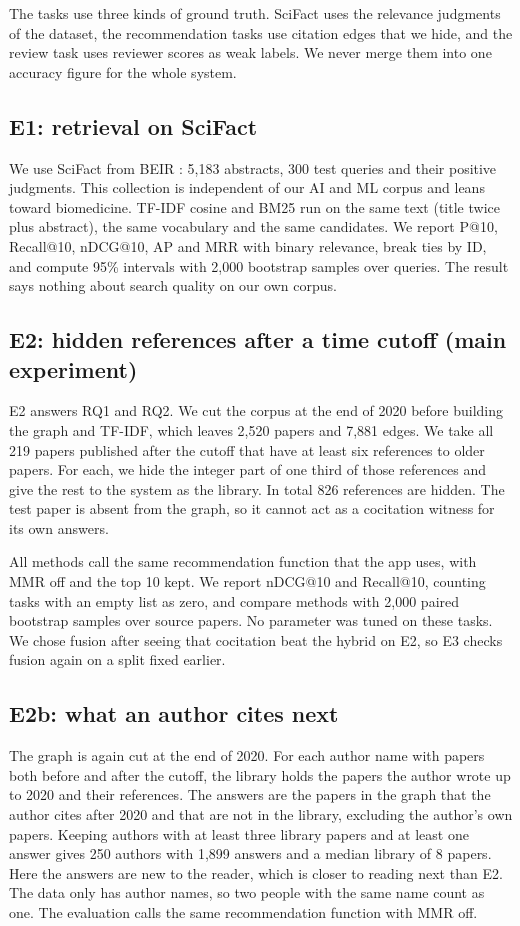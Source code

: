 \documentclass[11pt,a4paper]{article}
\begin{document}
The tasks use three kinds of ground truth. SciFact uses the relevance judgments of the dataset, the recommendation tasks use citation edges that we hide, and the review task uses reviewer scores as weak labels. We never merge them into one accuracy figure for the whole system.

\subsection{E1: retrieval on SciFact}
We use SciFact from BEIR \citep{wadden2020,thakur2021}: 5,183 abstracts, 300 test queries and their positive judgments. This collection is independent of our AI and ML corpus and leans toward biomedicine. TF-IDF cosine and BM25 run on the same text (title twice plus abstract), the same vocabulary and the same candidates. We report P@10, Recall@10, nDCG@10, AP and MRR with binary relevance, break ties by ID, and compute 95\% intervals with 2,000 bootstrap samples over queries. The result says nothing about search quality on our own corpus.

\subsection{E2: hidden references after a time cutoff (main experiment)}
E2 answers RQ1 and RQ2. We cut the corpus at the end of 2020 before building the graph and TF-IDF, which leaves 2,520 papers and 7,881 edges. We take all 219 papers published after the cutoff that have at least six references to older papers. For each, we hide the integer part of one third of those references and give the rest to the system as the library. In total 826 references are hidden. The test paper is absent from the graph, so it cannot act as a cocitation witness for its own answers.

All methods call the same recommendation function that the app uses, with MMR off and the top 10 kept. We report nDCG@10 and Recall@10, counting tasks with an empty list as zero, and compare methods with 2,000 paired bootstrap samples over source papers. No parameter was tuned on these tasks. We chose fusion after seeing that cocitation beat the hybrid on E2, so E3 checks fusion again on a split fixed earlier.

\subsection{E2b: what an author cites next}
The graph is again cut at the end of 2020. For each author name with papers both before and after the cutoff, the library holds the papers the author wrote up to 2020 and their references. The answers are the papers in the graph that the author cites after 2020 and that are not in the library, excluding the author's own papers. Keeping authors with at least three library papers and at least one answer gives 250 authors with 1,899 answers and a median library of 8 papers. Here the answers are new to the reader, which is closer to reading next than E2. The data only has author names, so two people with the same name count as one. The evaluation calls the same recommendation function with MMR off.
\end{document}
